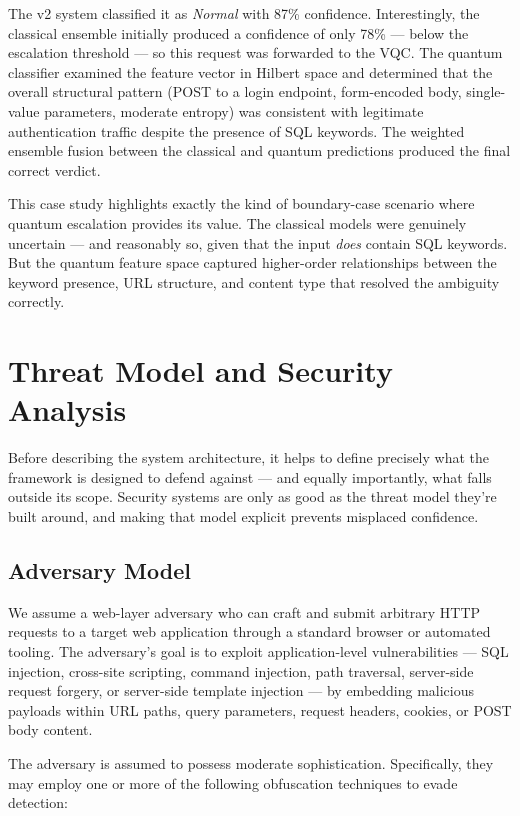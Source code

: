 \documentclass[journal,onecolumn]{IEEEtran}
\begin{document}
The v2 system classified it as \textit{Normal} with 87\% confidence. Interestingly, the classical ensemble initially produced a confidence of only 78\% --- below the escalation threshold --- so this request was forwarded to the VQC. The quantum classifier examined the feature vector in Hilbert space and determined that the overall structural pattern (POST to a login endpoint, form-encoded body, single-value parameters, moderate entropy) was consistent with legitimate authentication traffic despite the presence of SQL keywords. The weighted ensemble fusion between the classical and quantum predictions produced the final correct verdict.

This case study highlights exactly the kind of boundary-case scenario where quantum escalation provides its value. The classical models were genuinely uncertain --- and reasonably so, given that the input \textit{does} contain SQL keywords. But the quantum feature space captured higher-order relationships between the keyword presence, URL structure, and content type that resolved the ambiguity correctly.


\section{Threat Model and Security Analysis}

Before describing the system architecture, it helps to define precisely what the framework is designed to defend against --- and equally importantly, what falls outside its scope. Security systems are only as good as the threat model they're built around, and making that model explicit prevents misplaced confidence.

\subsection{Adversary Model}

We assume a web-layer adversary who can craft and submit arbitrary HTTP requests to a target web application through a standard browser or automated tooling. The adversary's goal is to exploit application-level vulnerabilities --- SQL injection, cross-site scripting, command injection, path traversal, server-side request forgery, or server-side template injection --- by embedding malicious payloads within URL paths, query parameters, request headers, cookies, or POST body content.

The adversary is assumed to possess moderate sophistication. Specifically, they may employ one or more of the following obfuscation techniques to evade detection:
\end{document}
